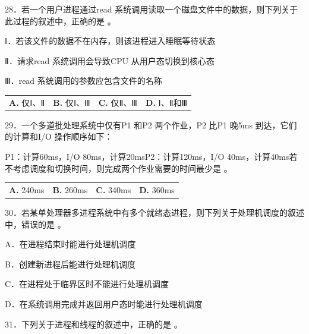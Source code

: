 \documentclass[UTF8,11pt]{ctexart}
\begin{document}
28．若一个用户进程通过read 系统调用读取一个磁盘文件中的数据，则下列关于此过程的叙述中，正确的是 。


Ⅰ．若该文件的数据不在内存，则该进程进入睡眠等待状态


Ⅱ．请求read 系统调用会导致CPU 从用户态切换到核心态


Ⅲ．read 系统调用的参数应包含文件的名称


\begin{center}\begin{tabular}{>{\raggedright\arraybackslash}p{\dimexpr(\linewidth-8\tabcolsep)/4\relax}>{\raggedright\arraybackslash}p{\dimexpr(\linewidth-8\tabcolsep)/4\relax}>{\raggedright\arraybackslash}p{\dimexpr(\linewidth-8\tabcolsep)/4\relax}>{\raggedright\arraybackslash}p{\dimexpr(\linewidth-8\tabcolsep)/4\relax}}
\textbf{A.} 仅Ⅰ、Ⅱ & \textbf{B.} 仅Ⅰ、Ⅲ & \textbf{C.} 仅Ⅱ、Ⅲ & \textbf{D.} Ⅰ、Ⅱ和Ⅲ\\[.35em]\end{tabular}\end{center}

29．一个多道批处理系统中仅有P1 和P2 两个作业，P2 比P1 晚5ms 到达，它们的计算和I/O 操作顺序如下：


P1：计算60ms，I/O 80ms，计算20msP2：计算120ms，I/O 40ms，计算40ms若不考虑调度和切换时间，则完成两个作业需要的时间最少是 。


\begin{center}\begin{tabular}{>{\raggedright\arraybackslash}p{\dimexpr(\linewidth-8\tabcolsep)/4\relax}>{\raggedright\arraybackslash}p{\dimexpr(\linewidth-8\tabcolsep)/4\relax}>{\raggedright\arraybackslash}p{\dimexpr(\linewidth-8\tabcolsep)/4\relax}>{\raggedright\arraybackslash}p{\dimexpr(\linewidth-8\tabcolsep)/4\relax}}
\textbf{A.} 240ms & \textbf{B.} 260ms & \textbf{C.} 340ms & \textbf{D.} 360ms\\[.35em]\end{tabular}\end{center}

30．若某单处理器多进程系统中有多个就绪态进程，则下列关于处理机调度的叙述中，错误的是 。


A．在进程结束时能进行处理机调度


B．创建新进程后能进行处理机调度


C．在进程处于临界区时不能进行处理机调度


D．在系统调用完成并返回用户态时能进行处理机调度


31．下列关于进程和线程的叙述中，正确的是 。
\end{document}

